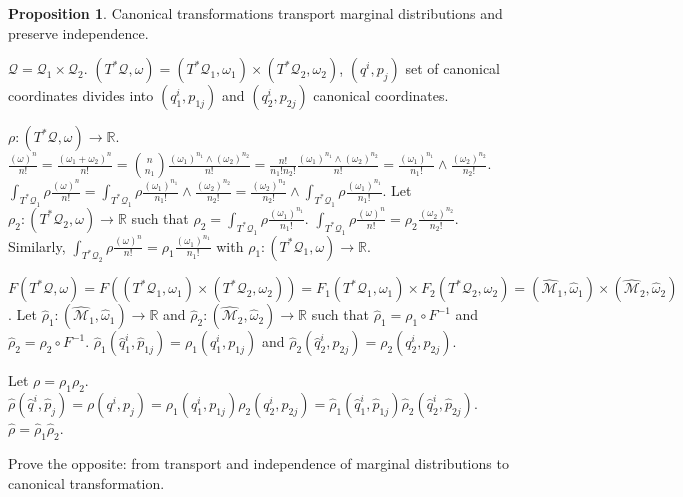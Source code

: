\documentclass[smallextended]{svjour3}
\numberwithin{equation}{section}
\theoremstyle{definition}
\newtheorem{prop}[equation]{Proposition}
\begin{document}
\begin{prop}
	Canonical transformations transport marginal distributions and preserve independence.
\end{prop}

$\mathcal{Q} = \mathcal{Q}_1 \times \mathcal{Q}_2$. $(T^*\mathcal{Q}, \omega)= (T^*\mathcal{Q}_1, \omega_1) \times (T^*\mathcal{Q}_2, \omega_2)$, $(q^i, p_j)$ set of canonical coordinates divides into $(q_1^i, p_{1j})$ and $(q_2^i, p_{2j})$ canonical coordinates.

$\rho : (T^*\mathcal{Q}, \omega) \rightarrow \mathbb{R}$. $\frac{(\omega)^n}{n!} = \frac{(\omega_1 + \omega_2)^n}{n!} = {n \choose n_1} \frac{(\omega_1)^{n_1} \wedge (\omega_2)^{n_2}}{n!} = \frac{n!}{n_1!n_2!}\frac{(\omega_1)^{n_1} \wedge (\omega_2)^{n_2}}{n!} = \frac{(\omega_1)^{n_1}}{n_1!} \wedge \frac{(\omega_2)^{n_2}}{n_2!} $. $\int_{T^*\mathcal{Q_1}}\rho \frac{(\omega)^n}{n!} = \int_{T^*\mathcal{Q_1}}\rho \frac{(\omega_1)^{n_1}}{n_1!} \wedge \frac{(\omega_2)^{n_2}}{n_2!} = \frac{(\omega_2)^{n_2}}{n_2!} \wedge \int_{T^*\mathcal{Q_1}}\rho \frac{(\omega_1)^{n_1}}{n_1!}$. Let $\rho_2 : (T^*\mathcal{Q}_2, \omega) \rightarrow \mathbb{R}$ such that $\rho_2 = \int_{T^*\mathcal{Q_1}}\rho \frac{(\omega_1)^{n_1}}{n_1!}$. $\int_{T^*\mathcal{Q_1}}\rho \frac{(\omega)^n}{n!} = \rho_2 \frac{(\omega_2)^{n_2}}{n_2!}$. Similarly, $\int_{T^*\mathcal{Q_2}}\rho \frac{(\omega)^n}{n!} = \rho_1 \frac{(\omega_1)^{n_1}}{n_1!}$ with $\rho_1 : (T^*\mathcal{Q}_1, \omega) \rightarrow \mathbb{R}$.

$F(T^*\mathcal{Q}, \omega) = F((T^*\mathcal{Q}_1, \omega_1) \times (T^*\mathcal{Q}_2, \omega_2)) = F_1(T^*\mathcal{Q}_1, \omega_1) \times F_2(T^*\mathcal{Q}_2, \omega_2) = (\hat{\mathcal{M}}_1, \hat{\omega}_1) \times (\hat{\mathcal{M}}_2, \hat{\omega}_2)$.
Let $\hat{\rho}_1 : (\hat{\mathcal{M}}_1, \hat{\omega}_1) \rightarrow \mathbb{R}$ and $\hat{\rho}_2 : (\hat{\mathcal{M}}_2, \hat{\omega}_2) \rightarrow \mathbb{R}$ such that $\hat{\rho}_1 = \rho_1 \circ F^{-1 }$ and $\hat{\rho}_2 = \rho_2 \circ F^{-1 }$.  $\hat{\rho}_1(\hat{q}_1^i, \hat{p}_{1j})=\rho_1(q_1^i, p_{1j})$ and $\hat{\rho}_2(\hat{q}_2^i, \hat{p}_{2j})=\rho_2(q_2^i, p_{2j})$.

Let $\rho=\rho_1\rho_2$. $\hat{\rho}(\hat{q}^i, \hat{p}_j) =\rho(q^i, p_j)=\rho_1(q_1^i, p_{1j})\rho_2(q_2^i, p_{2j})=\hat{\rho}_1(\hat{q}_1^i, \hat{p}_{1j})\hat{\rho}_2(\hat{q}_2^i, \hat{p}_{2j})$. $\hat{\rho}=\hat{\rho}_1\hat{\rho}_2$.

Prove the opposite: from transport and independence of marginal distributions to canonical transformation.
\end{document}
